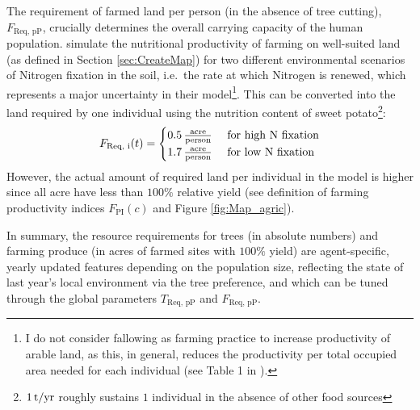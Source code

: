 The requirement of farmed land per person (in the absence of tree cutting), $F_\text{Req, pP}$, crucially determines the overall carrying capacity of the human population.
\citet{Puleston2017} simulate the nutritional productivity of farming on well-suited land (as defined in Section \ref{sec:CreateMap}) for two different environmental scenarios of Nitrogen fixation in the soil, i.e.\ the rate at which Nitrogen is renewed, which represents a major uncertainty in their model\footnote{I do not consider fallowing as farming practice to increase productivity of arable land, as this, in general, reduces the productivity per total occupied area needed for each individual (see Table 1 in ).}.
This can be converted into the land required by one individual using the nutrition content of sweet potato\footnote{$1\, \rm{t/yr}$ roughly sustains $1$ individual in the absence of other food sources}: 
\begin{equation}
F_\text{Req, i}(t) = \begin{cases}
	0.5 \, {\rm \frac{acre}{person} } & \text{ for high N fixation} \\
	1.7 \, {\rm \frac{acre}{person} } & \text{ for low N fixation} \\
 \end{cases}
\end{equation}
However, the actual amount of required land per individual in the model is higher since all acre have less than $100\%$ relative yield (see definition of farming productivity indices $F_\text{PI}(c)$ and Figure \ref{fig:Map_agric}).

In summary, the resource requirements for trees (in absolute numbers) and farming produce (in acres of farmed sites with $100\%$ yield) are agent-specific, yearly updated features depending on the population size, reflecting the state of last year's local environment via the tree preference, and which can be tuned through the global parameters $T_\text{Req, pP}$ and $F_\text{Req, pP}$.

